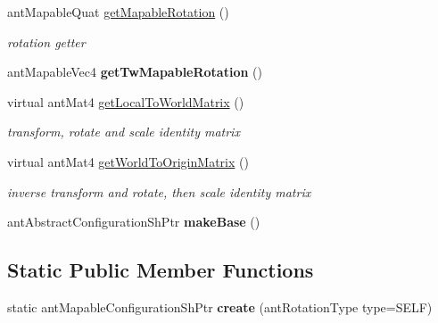 \begin{DoxyCompactItemize}
ant\+Mapable\+Quat \hyperlink{classant_mapable_configuration_ae7ceaa2c58d0538666bd73960cf4f8e4}{get\+Mapable\+Rotation} ()
\begin{DoxyCompactList}\small\item\em rotation getter \end{DoxyCompactList}\item 
\hypertarget{classant_mapable_configuration_a6071febe811791e1aa53c91e2d5be30d}{ant\+Mapable\+Vec4 {\bfseries get\+Tw\+Mapable\+Rotation} ()}\label{classant_mapable_configuration_a6071febe811791e1aa53c91e2d5be30d}

\item 
virtual ant\+Mat4 \hyperlink{classant_mapable_configuration_a5c9a9abf15b45ad0f6851dc3caf20342}{get\+Local\+To\+World\+Matrix} ()
\begin{DoxyCompactList}\small\item\em transform, rotate and scale identity matrix \end{DoxyCompactList}\item 
virtual ant\+Mat4 \hyperlink{classant_mapable_configuration_ac46245a2ba3b704309a85412c16d73ba}{get\+World\+To\+Origin\+Matrix} ()
\begin{DoxyCompactList}\small\item\em inverse transform and rotate, then scale identity matrix \end{DoxyCompactList}\item 
\hypertarget{classant_mapable_configuration_a0c4195ffdb71966119ebdea8ef5a46e6}{ant\+Abstract\+Configuration\+Sh\+Ptr {\bfseries make\+Base} ()}\label{classant_mapable_configuration_a0c4195ffdb71966119ebdea8ef5a46e6}

\end{DoxyCompactItemize}
\subsection*{Static Public Member Functions}
\begin{DoxyCompactItemize}
\item 
\hypertarget{classant_mapable_configuration_a32f253dd6ace10a4956a113d21f85666}{static ant\+Mapable\+Configuration\+Sh\+Ptr {\bfseries create} (ant\+Rotation\+Type type=S\+E\+L\+F)}\label{classant_mapable_configuration_a32f253dd6ace10a4956a113d21f85666}

\end{DoxyCompactItemize}
